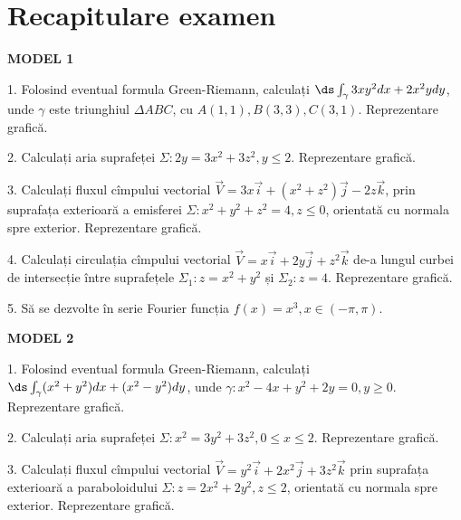
\chapter{Recapitulare examen}

\indent\indent\textbf{MODEL 1}

1. Folosind eventual formula Green-Riemann, calculați
$ \ds\int_\gamma 3xy^2 dx + 2x^2y dy $, unde $ \gamma $
este triunghiul $ \Delta ABC $, cu $ A(1, 1), B(3, 3), C(3, 1) $.
Reprezentare grafică.

\vspace{0.3cm}

2. Calculați aria suprafeței $ \Sigma: 2y = 3x^2 + 3z^2, y \leq 2 $.
Reprezentare grafică.

\vspace{0.3cm}

3. Calculați fluxul cîmpului vectorial $ \vec{V} = 3x \vec{i} + (x^2 + z^2)\vec{j} - 2z\vec{k} $,
prin suprafața exterioară a emisferei $ \Sigma: x^2 + y^2 + z^2 = 4, z \leq 0 $,
orientată cu normala spre exterior. Reprezentare grafică.

\vspace{0.3cm}

4. Calculați circulația cîmpului vectorial $ \vec{V} = x\vec{i} + 2y\vec{j} + z^2 \vec{k} $
de-a lungul curbei de intersecție între suprafețele $ \Sigma_1: z = x^2 + y^2 $
și $ \Sigma_2: z = 4 $. Reprezentare grafică.

\vspace{0.3cm}

5. Să se dezvolte în serie Fourier funcția $ f(x) = x^3, x \in (-\pi, \pi) $.

\vspace{2cm}

\textbf{MODEL 2}

1. Folosind eventual formula Green-Riemann, calculați $ \ds\int_\gamma (x^2 + y^2) dx + (x^2 - y^2) dy $,
unde $ \gamma: x^2 - 4x + y^2 + 2y = 0, y \geq 0 $. Reprezentare grafică.

\vspace{0.3cm}

2. Calculați aria suprafeței $ \Sigma: x^2 = 3y^2 + 3z^2, 0 \leq x \leq 2 $. Reprezentare grafică.

\vspace{0.3cm}

3. Calculați fluxul cîmpului vectorial $ \vec{V} = y^2 \vec{i} + 2x^2 \vec{j} + 3z^2 \vec{k} $
prin suprafața exterioară a paraboloidului $ \Sigma: z = 2x^2 + 2y^2, z \leq 2 $,
orientată cu normala spre exterior. Reprezentare grafică.

